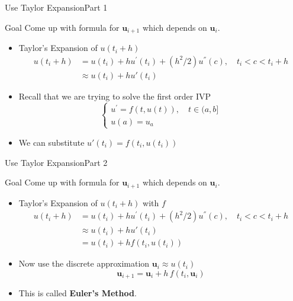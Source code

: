 \documentclass[10pt]{beamer}
\begin{document}

\begin{frame}{Use Taylor Expansion}{Part 1}

\begin{block}{Goal}
    Come up with formula for $\textbf{u}_{i+1}$ which depends on $\textbf{u}_i$. 
\end{block}

\begin{itemize}
    \item Taylor's Expansion of $u(t_i+h)$
    \begin{align*}        
    u(t_i+h) &= u(t_i) + h u^\prime(t_i) + (h^2/2) u^{''}(c), \quad t_i < c < t_i+h\\
           &\approx u(t_i) + h u'(t_i) 
    \end{align*}

    \item Recall that we are trying to solve the first order IVP 
        $$
        \begin{cases}
		u^\prime = f(t,u(t)), \quad t \in (a,b]\\
		u(a) = u_a
	\end{cases}
        $$
    \item We can substitute $u'(t_i) = f(t_i, u(t_i))$
\end{itemize}

\end{frame}
\begin{frame}{Use Taylor Expansion}{Part 2}

\begin{block}{Goal}
    Come up with formula for $\textbf{u}_{i+1}$ which depends on $\textbf{u}_i$. 
\end{block}

\begin{itemize}
    \item Taylor's Expansion of $u(t_i+h)$ with $f$
    \begin{align*}        
    u(t_i+h) &= u(t_i) + h u^\prime(t_i) + (h^2/2) u^{''}(c), \quad t_i < c < t_i+h\\
           &\approx u(t_i) + h u'(t_i) \\
           &= u(t_i) + h f(t_i, u(t_i))
    \end{align*}

    \item Now use the discrete approximation $\textbf{u}_i \approx u(t_i)$
        $$
        \textbf{u}_{i+1} = \textbf{u}_i + h\,f(t_i, \textbf{u}_i )
        $$
    \item This is called \textbf{Euler's Method}.
\end{itemize}

\end{frame}
\end{document}
